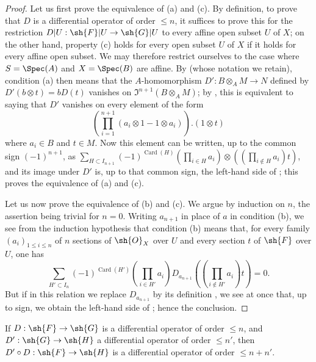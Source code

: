 \begin{proof}
Let us first prove the equivalence of (a) and (c).
By definition, to prove that $D$ is a differential operator of order $\leq n$, it suffices to prove this for the restriction $D|U: \sh{F}|U \to \sh{G}|U$ to every affine open subset $U$ of $X$; on the other hand, property (c) holds for every open subset $U$ of $X$ if it holds for every affine open subset.
We may therefore restrict ourselves to the case where $S = \Spec(A)$ and $X = \Spec(B)$ are affine.
By  (whose notation we retain), condition (a) then means that the $A$-homomorphism $D': B \otimes_A M \to N$ defined by $D'(b \otimes t) = b D(t)$ vanishes on $\mathfrak{I}^{n+1}(B \otimes_A M)$; by , this is equivalent to saying that $D'$ vanishes on every element of the form
\[
  (\prod_{i=1}^{n+1} (a_i \otimes 1 - 1 \otimes a_i) ) . (1 \otimes t)
\]
where $a_i \in B$ and $t \in M$.
Now this element can be written, up to the common sign $(-1)^{n+1}$, as $\sum_{H \subset I_{n+1}} (-1)^{\operatorname{Card}(H)} (\prod_{i \in H} a_i) \otimes ((\prod_{i \notin H} a_i ) t )$, and its image under $D'$ is, up to that common sign, the left-hand side of ; this proves the equivalence of (a) and (c).

Let us now prove the equivalence of (b) and (c).
We argue by induction on $n$, the assertion being trivial for $n=0$.
Writing $a_{n+1}$ in place of $a$ in condition (b), we see from the induction hypothesis that condition (b) means that, for every family $(a_i)_{1 \leq i \leq n}$ of $n$ sections of $\sh{O}_X$ over $U$ and every section $t$ of $\sh{F}$ over $U$, one has
\[
  \sum_{H' \subset I_n} (-1)^{\operatorname{Card}(H')}  (\prod_{i \in H'} a_i) D_{a_{n+1}} ((\prod_{i \notin H'} a_i ) t ) = 0.
\]
But if in this relation we replace $D_{a_{n+1}}$ by its definition , we see at once that, up to sign, we obtain the left-hand side of ; hence the conclusion.
\end{proof}

\begin{proposition}[16.8.9]
\label{IV.16.8.9}
If $D: \sh{F} \to \sh{G}$ is a differential operator of order $\leq n$, and $D': \sh{G} \to \sh{H}$ a differential operator of order $\leq n'$, then $D' \circ D: \sh{F} \to \sh{H}$ is a differential operator of order $\leq n + n'$.
\end{proposition}

